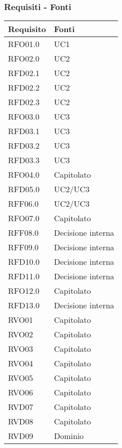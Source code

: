 \subsubsection{Requisiti - Fonti}
{
    \setlength{\freewidth}{\dimexpr\textwidth-8\tabcolsep}
    \renewcommand{\arraystretch}{1.5}
    \centering
    \setlength{\aboverulesep}{0pt}
    \setlength{\belowrulesep}{0pt}
    \begin{longtable}{C{.50\freewidth} C{.50\freewidth}}
        \toprule 
        \textbf{Requisito} & \textbf{Fonti} \\
        \toprule
        \endhead

        RFO01.0  & UC1 \\
        RFO02.0  & UC2 \\
        RFD02.1  & UC2 \\
        RFD02.2  & UC2 \\
        RFD02.3  & UC2 \\
        RFO03.0  & UC3 \\
        RFD03.1  & UC3 \\
        RFD03.2  & UC3 \\
        RFD03.3  & UC3 \\
        RFO04.0  & Capitolato \\
        RFD05.0  & UC2/UC3 \\
        RFF06.0  & UC2/UC3 \\
        RFO07.0  & Capitolato \\
        RFF08.0  & Decisione interna \\
        RFF09.0  & Decisione interna \\
        RFD10.0  & Decisione interna \\
        RFD11.0  & Decisione interna \\
        RFO12.0  & Capitolato \\
        RFD13.0  & Decisione interna \\

        RVO01    & Capitolato \\
        RVO02    & Capitolato \\
        RVO03    & Capitolato \\
        RVO04    & Capitolato \\
        RVO05    & Capitolato \\
        RVO06    & Capitolato \\
        RVD07    & Capitolato \\
        RVD08    & Capitolato \\
        RVD09    & Dominio \\


\end{longtable}}
